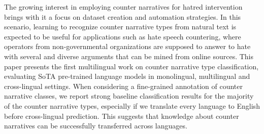 The growing interest in employing counter narratives for hatred intervention brings with it a focus on dataset creation and automation strategies. In this scenario, learning to recognize counter narrative types from natural text is expected to be useful for applications such as hate speech countering, where operators from non-governmental organizations are supposed to answer to hate with several and diverse arguments that can be mined from online sources. This paper presents the first multilingual work on counter narrative type classification, evaluating SoTA pre-trained language models in monolingual, multilingual and cross-lingual settings. When considering a fine-grained annotation of counter narrative classes, we report strong baseline classification results for the majority of the counter narrative types, especially if we translate every language to English before cross-lingual prediction. This suggests that knowledge about counter narratives can be successfully transferred across languages.
